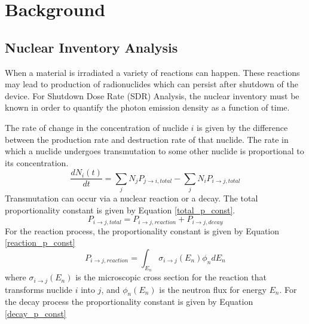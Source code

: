 \section{Background}


\subsection{Nuclear Inventory Analysis}
When a material is irradiated a variety of reactions can happen. These 
reactions may lead to production of radionuclides which can persist
after shutdown of the device. For Shutdown Dose Rate (SDR) Analysis, 
the nuclear inventory must be known
in order to quantify the photon emission density as a function of time.

The rate of change in the concentration of nuclide $i$ is given by the 
difference between the production rate and destruction rate of that nuclide.
The rate in which a nuclide undergoes transmutation to some other nuclide
is proportional to its concentration. 
\begin{equation}\label{rate_change_i}
  \frac{dN_{i}(t)}{dt} = \sum_{j} N_{j}P_{j \rightarrow i, total}
  - \sum_{j} N_{i}P_{i \rightarrow j, total}
\end{equation}
Transmutation can occur via a nuclear reaction or a decay. The total
proportionality constant is given by Equation \ref{total_p_const}.
\begin{equation}\label{total_p_const}
  P_{i \rightarrow j, total} = P_{i \rightarrow j, reaction } +
  P_{i \rightarrow j, decay}
\end{equation}
For the reaction process, the proportionality constant is given by
Equation \ref{reaction_p_const}
\begin{equation}\label{reaction_p_const}
  P_{i \rightarrow j, reaction } =
  \int_{E_{n}} \sigma_{i \rightarrow j}(E_{n})
  \phi_{n}dE_{n}
\end{equation}
where $\sigma_{i \rightarrow j}(E_{n})$ is the microscopic cross
section for the reaction that transforms nuclide $i$ into $j$, and
 $\phi_{n}(E_{n})$ is the neutron flux for energy $E_{n}$.
For the decay process the proportionality constant is given by Equation
\ref{decay_p_const}

